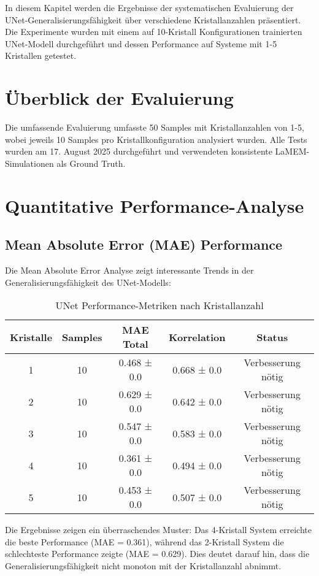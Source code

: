 \documentclass[12pt,twoside,openright]{scrreprt}
\theoremstyle{definition}
\theoremstyle{plain}
\begin{document}
In diesem Kapitel werden die Ergebnisse der systematischen Evaluierung der UNet-Generalisierungsfähigkeit über verschiedene Kristallanzahlen präsentiert. Die Experimente wurden mit einem auf 10-Kristall Konfigurationen trainierten UNet-Modell durchgeführt und dessen Performance auf Systeme mit 1-5 Kristallen getestet.

\section{Überblick der Evaluierung}

Die umfassende Evaluierung umfasste 50 Samples mit Kristallanzahlen von 1-5, wobei jeweils 10 Samples pro Kristallkonfiguration analysiert wurden. Alle Tests wurden am 17. August 2025 durchgeführt und verwendeten konsistente LaMEM-Simulationen als Ground Truth.

\section{Quantitative Performance-Analyse}

\subsection{Mean Absolute Error (MAE) Performance}

Die Mean Absolute Error Analyse zeigt interessante Trends in der Generalisierungsfähigkeit des UNet-Modells:

\begin{table}[htbp]
\centering
\caption{UNet Performance-Metriken nach Kristallanzahl}
\label{tab:performance_overview}
\begin{tabular}{@{}ccccc@{}}
\toprule
\textbf{Kristalle} & \textbf{Samples} & \textbf{MAE Total} & \textbf{Korrelation} & \textbf{Status} \\
\midrule
1 & 10 & 0.468 ± 0.0 & 0.668 ± 0.0 & Verbesserung nötig \\
2 & 10 & 0.629 ± 0.0 & 0.642 ± 0.0 & Verbesserung nötig \\
3 & 10 & 0.547 ± 0.0 & 0.583 ± 0.0 & Verbesserung nötig \\
4 & 10 & 0.361 ± 0.0 & 0.494 ± 0.0 & Verbesserung nötig \\
5 & 10 & 0.453 ± 0.0 & 0.507 ± 0.0 & Verbesserung nötig \\
\bottomrule
\end{tabular}
\end{table}

Die Ergebnisse zeigen ein überraschendes Muster: Das 4-Kristall System erreichte die beste Performance (MAE = 0.361), während das 2-Kristall System die schlechteste Performance zeigte (MAE = 0.629). Dies deutet darauf hin, dass die Generalisierungsfähigkeit nicht monoton mit der Kristallanzahl abnimmt.
\end{document}
